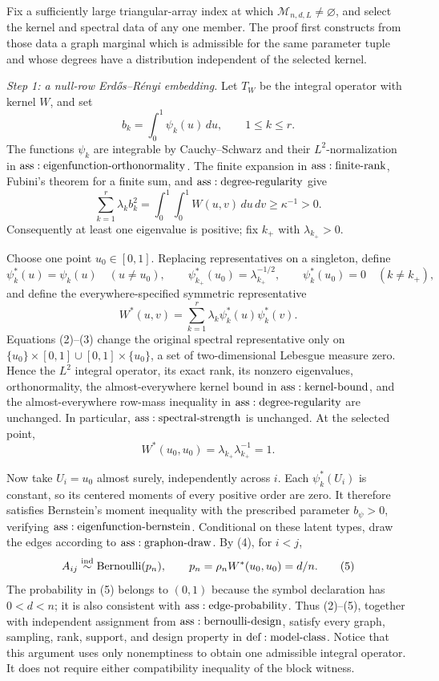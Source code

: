 Fix a sufficiently large triangular-array index at which \(\mathcal M_{n,d,L}\neq\varnothing\), and select the kernel and spectral data of any one member.  The proof first constructs from those data a graph marginal which is admissible for the same parameter tuple and whose degrees have a distribution independent of the selected kernel.

\textit{Step 1: a null-row Erd\H{o}s--R\'enyi embedding.}
Let \(T_W\) be the integral operator with kernel \(W\), and set
\[
 b_k=\int_0^1\psi_k(u)\,du,
 \qquad 1\leq k\leq r.
\]
The functions \(\psi_k\) are integrable by Cauchy--Schwarz and their \(L^2\)-normalization in \({\rm ass:eigenfunction\text{-}orthonormality}\).  The finite expansion in \({\rm ass:finite\text{-}rank}\), Fubini's theorem for a finite sum, and \({\rm ass:degree\text{-}regularity}\) give
\[
 \sum_{k=1}^r\lambda_k b_k^2
 =\int_0^1\!\int_0^1W(u,v)\,du\,dv
 \geq\kappa^{-1}>0.
\tag{1}
\]
Consequently at least one eigenvalue is positive; fix \(k_+\) with \(\lambda_{k_+}>0\).

Choose one point \(u_0\in[0,1]\).  Replacing representatives on a singleton, define
\[
 \psi_k^*(u)=\psi_k(u)\quad(u\neq u_0),
 \qquad
 \psi_{k_+}^*(u_0)=\lambda_{k_+}^{-1/2},
 \qquad
 \psi_k^*(u_0)=0\quad(k\neq k_+),
\tag{2}
\]
and define the everywhere-specified symmetric representative
\[
 W^*(u,v)=\sum_{k=1}^r\lambda_k\psi_k^*(u)\psi_k^*(v).
\tag{3}
\]
Equations (2)--(3) change the original spectral representative only on
\(\{u_0\}\times[0,1]\cup[0,1]\times\{u_0\}\), a set of two-dimensional Lebesgue measure zero.  Hence the \(L^2\) integral operator, its exact rank, its nonzero eigenvalues, orthonormality, the almost-everywhere kernel bound in \({\rm ass:kernel\text{-}bound}\), and the almost-everywhere row-mass inequality in \({\rm ass:degree\text{-}regularity}\) are unchanged.  In particular, \({\rm ass:spectral\text{-}strength}\) is unchanged.  At the selected point,
\[
 W^*(u_0,u_0)=\lambda_{k_+}\lambda_{k_+}^{-1}=1.
\tag{4}
\]

Now take \(U_i=u_0\) almost surely, independently across \(i\).  Each \(\psi_k^*(U_i)\) is constant, so its centered moments of every positive order are zero.  It therefore satisfies Bernstein's moment inequality with the prescribed parameter \(b_\psi>0\), verifying \({\rm ass:eigenfunction\text{-}bernstein}\).  Conditional on these latent types, draw the edges according to \({\rm ass:graphon\text{-}draw}\).  By (4), for \(i<j\),
\[
 A_{ij}\overset{\mathrm{ind}}{\sim}{\rm Bernoulli}(p_n),
 \qquad p_n=\rho_nW^*(u_0,u_0)=d/n.
\tag{5}
\]
The probability in (5) belongs to \((0,1)\) because the symbol declaration has \(0<d<n\); it is also consistent with \({\rm ass:edge\text{-}probability}\).  Thus (2)--(5), together with independent assignment from \({\rm ass:bernoulli\text{-}design}\), satisfy every graph, sampling, rank, support, and design property in \({\rm def:model\text{-}class}\).  Notice that this argument uses only nonemptiness to obtain one admissible integral operator.  It does not require either compatibility inequality of the block witness.

